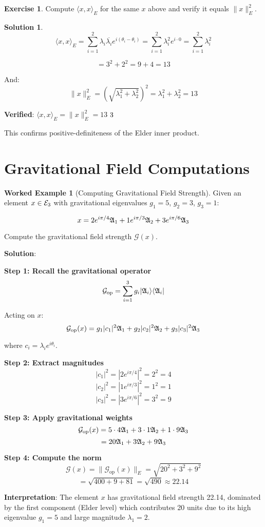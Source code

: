 \documentclass[12pt,a4paper]{article}
\newcommand{\checkmark}{\ding{51}}
\theoremstyle{definition}
\newtheorem{exercise}{Exercise}[section]
\newtheorem{solution}{Solution}[section]
\newtheorem{example}{Worked Example}[section]
\theoremstyle{remark}
\begin{document}
\begin{exercise}
Compute $\langle x, x \rangle_E$ for the same $x$ above and verify it equals $\|x\|_E^2$.
\end{exercise}

\begin{solution}
$$\langle x, x \rangle_E = \sum_{i=1}^{2} \lambda_i \overline{\lambda_i} e^{i(\theta_i - \theta_i)} = \sum_{i=1}^{2} \lambda_i^2 e^{i \cdot 0} = \sum_{i=1}^{2} \lambda_i^2$$

$$= 3^2 + 2^2 = 9 + 4 = 13$$

And:
$$\|x\|_E^2 = \left(\sqrt{\lambda_1^2 + \lambda_2^2}\right)^2 = \lambda_1^2 + \lambda_2^2 = 13$$

\textbf{Verified}: $\langle x, x \rangle_E = \|x\|_E^2 = 13$ $\checkmark$

This confirms positive-definiteness of the Elder inner product.
\end{solution}

\newpage
\section{Gravitational Field Computations}

\begin{example}[Computing Gravitational Field Strength]
Given an element $x \in \mathcal{E}_{3}$ with gravitational eigenvalues $g_1 = 5$, $g_2 = 3$, $g_3 = 1$:

$$x = 2e^{i\pi/4} \mathfrak{A}_{1} + 1e^{i\pi/3} \mathfrak{A}_{2} + 3e^{i\pi/6} \mathfrak{A}_{3}$$

Compute the gravitational field strength $\mathcal{G}(x)$.

\textbf{Solution}:

\textbf{Step 1: Recall the gravitational operator}
$$\mathcal{G}_{\text{op}} = \sum_{i=1}^{3} g_i |\mathfrak{A}_{i}\rangle\langle\mathfrak{A}_{i}|$$

Acting on $x$:
$$\mathcal{G}_{\text{op}}(x) = g_1|c_1|^2\mathfrak{A}_{1} + g_2|c_2|^2\mathfrak{A}_{2} + g_3|c_3|^2\mathfrak{A}_{3}$$

where $c_i = \lambda_i e^{i\theta_i}$.

\textbf{Step 2: Extract magnitudes}
$$|c_1|^2 = |2e^{i\pi/4}|^2 = 2^2 = 4$$
$$|c_2|^2 = |1e^{i\pi/3}|^2 = 1^2 = 1$$
$$|c_3|^2 = |3e^{i\pi/6}|^2 = 3^2 = 9$$

\textbf{Step 3: Apply gravitational weights}
$$\mathcal{G}_{\text{op}}(x) = 5 \cdot 4 \mathfrak{A}_{1} + 3 \cdot 1 \mathfrak{A}_{2} + 1 \cdot 9 \mathfrak{A}_{3}$$
$$= 20\mathfrak{A}_{1} + 3\mathfrak{A}_{2} + 9\mathfrak{A}_{3}$$

\textbf{Step 4: Compute the norm}
$$\mathcal{G}(x) = \|\mathcal{G}_{\text{op}}(x)\|_E = \sqrt{20^2 + 3^2 + 9^2}$$
$$= \sqrt{400 + 9 + 81} = \sqrt{490} \approx 22.14$$

\textbf{Interpretation}: The element $x$ has gravitational field strength 22.14, dominated by the first component (Elder level) which contributes 20 units due to its high eigenvalue $g_1 = 5$ and large magnitude $\lambda_1 = 2$.
\end{example}
\end{document}
